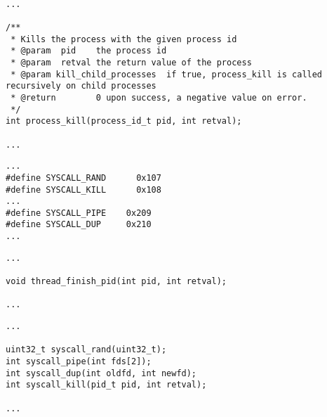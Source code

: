 \documentclass[12pt]{article}
\begin{document}
\begin{lstlisting}[caption=process.h]

...

/**
 * Kills the process with the given process id
 * @param  pid    the process id
 * @param  retval the return value of the process
 * @param kill_child_processes  if true, process_kill is called recursively on child processes
 * @return        0 upon success, a negative value on error.
 */
int process_kill(process_id_t pid, int retval);

...

\end{lstlisting}

\begin{lstlisting}[caption=syscall.h]
...
#define SYSCALL_RAND      0x107
#define SYSCALL_KILL      0x108
...
#define SYSCALL_PIPE    0x209
#define SYSCALL_DUP     0x210
...
\end{lstlisting}

\begin{lstlisting}[caption=thread.h]
...

void thread_finish_pid(int pid, int retval);

...
\end{lstlisting}

\begin{lstlisting}[caption=lib.h]
...

uint32_t syscall_rand(uint32_t);
int syscall_pipe(int fds[2]);
int syscall_dup(int oldfd, int newfd);
int syscall_kill(pid_t pid, int retval);

...
\end{lstlisting}
\end{document}

